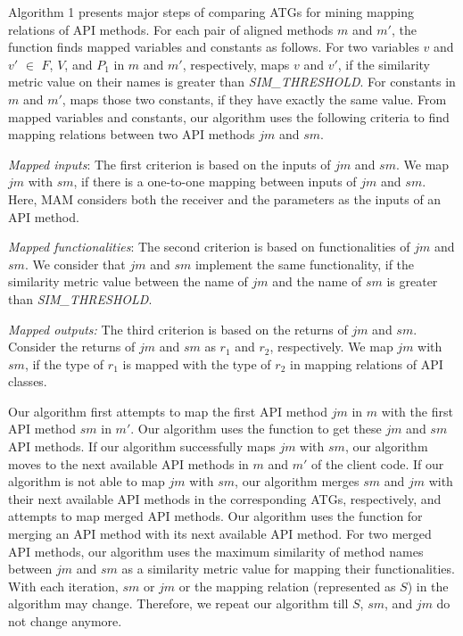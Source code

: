 Algorithm 1 presents major steps of comparing ATGs for mining
mapping relations of API methods. For each pair of aligned methods $m$ and $m'$, the  function finds mapped variables and constants as follows. For two variables $v$ and $v'$ $\in$ $F$, $V$, and $P_1$ in $m$ and $m'$, respectively,
 maps $v$ and $v'$, if the similarity metric value on their names is greater
than \emph{SIM\_THRESHOLD}. For constants in $m$ and $m'$, 
maps those two constants, if they have exactly the same
value. From mapped variables and constants, our algorithm uses the following criteria to find mapping relations between two API methods $jm$ and $sm$.

\emph{Mapped inputs}: The first criterion is based on the inputs
of $jm$ and $sm$. We map $jm$ with $sm$, if there is a one-to-one
mapping between inputs of $jm$ and $sm$. Here, MAM
considers both the receiver and the parameters as the inputs of an
API method.

\emph{Mapped functionalities}: The second criterion is based on functionalities of
$jm$ and $sm$. We consider that $jm$ and $sm$ implement the same functionality,
if the similarity metric value between the name of $jm$ and the name of $sm$ is
greater than \emph{SIM\_THRESHOLD}.

\emph{Mapped outputs:} The third criterion is based on the returns of $jm$ and $sm$.
Consider the returns of $jm$ and $sm$ as $r_1$ and $r_2$, respectively. We map $jm$
with $sm$, if the type of $r_1$ is mapped with the type of $r_2$ in
mapping relations of API classes.

Our algorithm first attempts to map the first API method $jm$ in $m$
with the first API method $sm$ in $m'$. Our algorithm uses the 
function to get these $jm$ and $sm$ API methods. If our algorithm successfully maps $jm$ with
$sm$, our algorithm moves to the next available API methods in $m$
and $m'$ of the client code. If our algorithm is not able to map $jm$
with $sm$, our algorithm merges $sm$ and $jm$ with their next available API methods
in the corresponding ATGs, respectively, and attempts to map merged API methods.
Our algorithm uses the  function for merging an API method with its
next available API method. For two merged API methods, our algorithm uses the
maximum similarity of method names between $jm$ and $sm$ as a
similarity metric value for mapping their functionalities.
With each iteration, $sm$ or $jm$ or the mapping relation (represented as $S$)
in the algorithm may change. Therefore, we repeat our algorithm
till $S$, $sm$, and $jm$ do not change anymore.

